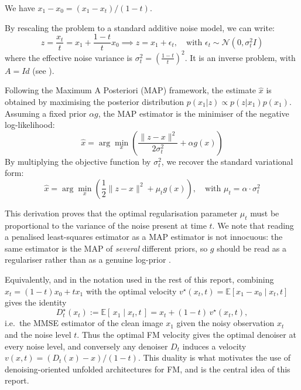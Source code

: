 \documentclass[a4paper,11pt]{article}
\theoremstyle{plain}{\theorembodyfont{\rmfamily}%
\newtheorem{proposition}[theorem]{Proposition}}
\theoremstyle{plain}{\theorembodyfont{\rmfamily}%
\newtheorem{notation}[theorem]{Notation}}
\theoremstyle{plain}{\theorembodyfont{\rmfamily}%
\newtheorem{assumption}[theorem]{Assumption}}
\theoremstyle{plain}{\theorembodyfont{\rmfamily}%
\newtheorem{problem}[theorem]{Problem}}
\theoremstyle{plain}{\theorembodyfont{\rmfamily}%
\newtheorem{example}[theorem]{Example}}
\theoremstyle{plain}{\theorembodyfont{\rmfamily}%
\newtheorem{remark}[theorem]{Remark}}
\theoremstyle{plain}{\theorembodyfont{\rmfamily}%
\newtheorem{definition}[theorem]{Definition}}
\theoremstyle{plain}{\theorembodyfont{\rmfamily}%
\newtheorem{question}[theorem]{Question}}
\numberwithin{equation}{section}
\begin{document}
\begin{remark}
We have $x_1 - x_0 = (x_1 - x_t)/(1 - t)$.
\end{remark}

By rescaling the problem to a standard additive noise model, we can write:
\begin{equation}\label{denoising_equ}
z = \frac{x_t}{t} = x_1 + \frac{1-t}{t} x_0 \implies z = x_1 + \epsilon_t, \quad \text{with } \epsilon_t \sim \mathcal{N}(0, \sigma_t^2 I)
\end{equation}
where the effective noise variance is $\sigma_t^2 = \left( \frac{1-t}{t} \right)^2$. It is an inverse problem, with $A = Id$ (see \cite{gagneux2025generation}).

Following the Maximum A Posteriori (MAP) framework, the estimate $\hat{x}$ is obtained by maximising the posterior distribution $p(x_1 | z) \propto p(z | x_1) p(x_1)$. Assuming a fixed prior $\alpha g$, the MAP estimator is the minimiser of the negative log-likelihood:
\begin{equation}
\hat{x} = \arg\min_{x} \left( \frac{\|z - x\|^2}{2\sigma_t^2} + \alpha g(x) \right)
\end{equation}
By multiplying the objective function by $\sigma_t^2$, we recover the standard variational form:
\begin{equation}
\hat{x} = \arg\min_{x} \left( \frac{1}{2} \|z - x\|^2 + \mu_t g(x) \right), \quad \text{with } \mu_t = \alpha \cdot \sigma_t^2
\end{equation}

This derivation proves that the optimal regularisation parameter $\mu_t$ must be
proportional to the variance of the noise present at time $t$. We note that reading
a penalised least-squares estimator as a MAP estimator is not innocuous: the same
estimator is the MAP of \emph{several} different priors, so $g$ should be read as a
regulariser rather than as a genuine log-prior \cite{gribonval2011should}.

Equivalently, and in the notation used in the rest of this report, combining
$x_t = (1-t)x_0 + t x_1$ with the optimal velocity
$v^\star(x_t,t) = \mathbb{E}[x_1 - x_0 \mid x_t, t]$ gives the identity
\cite[Formula (5)]{gagneux2025generation}
\begin{equation}
  D^\star_t(x_t) := \mathbb{E}[\,x_1 \mid x_t, t\,] = x_t + (1-t)\, v^\star(x_t, t),
  \label{eq:fm-denoise}
\end{equation}
i.e.\ the MMSE estimator of the clean image $x_1$ given the noisy observation $x_t$
and the noise level $t$. Thus the optimal FM velocity gives the optimal denoiser at
every noise level, and conversely any denoiser $D_t$ induces a velocity
$v(x,t) = (D_t(x) - x)/(1-t)$. This duality is what motivates the use of
denoising-oriented unfolded architectures for FM, and is the central idea of this
report.
\end{document}
